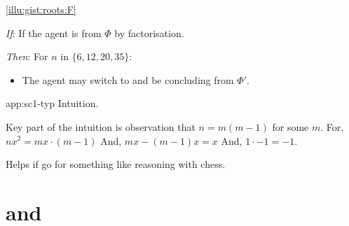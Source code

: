 \begin{note}
  \begin{application}%
    \label{app:sc1-typ}%
    \autoref{illu:gist:roots:F}
    \begin{itenum}
    \item[\emph{If}:]
      If the agent is \tCV{}  from \(\Phi\) by factorisation.
    \item[\emph{Then}:]
      For \(n\) in  \(\{6, 12, 20, 35\}\):
      \begin{itemize}
      \item
        The agent may switch to \rootsConEqGen{} and be concluding  from \(\Phi'\).
      \end{itemize}
    \end{itenum}
  \end{application}

  \begin{dets}{app:sc1-typ}
    Intuition.

    Key part of the intuition is observation that \(n = m(m-1)\) for some \(m\).
    For, \(nx^{2} = mx \cdot (m-1)\)
    And, \(mx - (m-1)x = x\)
    And, \(1 \cdot - 1 = - 1\).

    Helps if go for something like reasoning with chess.
  \end{dets}
\end{note}



\section{ and }
\label{sec:tcv3-requ1}


